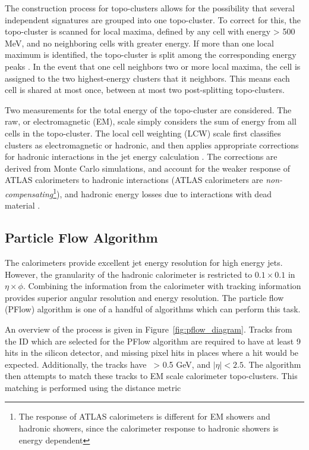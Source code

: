 The construction process for topo-clusters allows for the possibility that several independent signatures are grouped into one topo-cluster. To correct for this, the topo-cluster is scanned for local maxima, defined by any cell with energy > 500 MeV, and no neighboring cells with greater energy. If more than one local maximum is identified, the topo-cluster is split among the corresponding energy peaks \cite{topo_clusters}. In the event that one cell neighbors two or more local maxima, the cell is assigned to the two highest-energy clusters that it neighbors. This means each cell is shared at most once, between at most two post-splitting topo-clusters.\par

Two measurements for the total energy of the topo-cluster are considered. The raw, or electromagnetic (EM), scale simply considers the sum of energy from all cells in the topo-cluster. The local cell weighting (LCW) scale first classifies clusters as electromagnetic or hadronic, and then applies appropriate corrections for hadronic interactions in the jet energy calculation \cite{jet_reco}. The corrections are derived from Monte Carlo simulations, and account for the weaker response of ATLAS calorimeters to hadronic interactions (ATLAS calorimeters are \textit{non-compensating}\footnote{The response of ATLAS calorimeters is different for EM showers and hadronic showers, since the calorimeter response to hadronic showers is energy dependent}), and hadronic energy losses due to interactions with dead material \cite{topo_clusters}. \par

\subsection{Particle Flow Algorithm}
The calorimeters provide excellent jet energy resolution for high energy jets. However, the granularity of the hadronic calorimeter is restricted to $0.1 \times 0.1$ in $\eta \times \phi$. Combining the information from the calorimeter with tracking information provides superior angular resolution and energy resolution. The particle flow (PFlow) algorithm is one of a handful of algorithms which can perform this task.\par

An overview of the process is given in Figure~\ref{fig:pflow_diagram}. Tracks from the ID which are selected for the PFlow algorithm are required to have at least 9 hits in the silicon detector, and missing pixel hits in places where a hit would be expected. Additionally, the tracks have \pt~> 0.5 GeV, and $|\eta| < 2.5$. The algorithm then attempts to match these tracks to EM scale calorimeter topo-clusters. This matching is performed using the distance metric 

